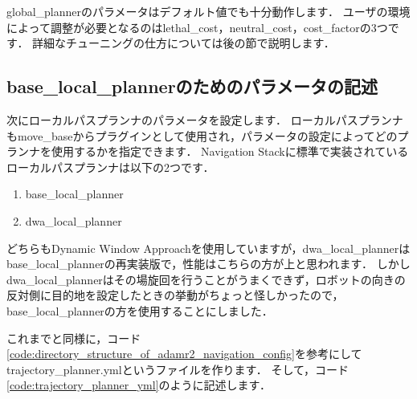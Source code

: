 \documentclass[{../../master}]{subfiles}
\begin{document}
\textsf{global\_planner}のパラメータはデフォルト値でも十分動作します．
ユーザの環境によって調整が必要となるのは\textsf{lethal\_cost}，\textsf{neutral\_cost}，\textsf{cost\_factor}の3つです．
詳細なチューニングの仕方については後の節で説明します．

\subsection{\textsf{base\_local\_planner}のためのパラメータの記述}

次にローカルパスプランナのパラメータを設定します．
ローカルパスプランナも\textsf{move\_base}からプラグインとして使用され，パラメータの設定によってどのプランナを使用するかを指定できます．
Navigation Stackに標準で実装されているローカルパスプランナは以下の2つです．

\begin{enumerate}
  \item \textsf{base\_local\_planner}
  \item \textsf{dwa\_local\_planner}
\end{enumerate}

どちらもDynamic Window Approach\cite{dwa}を使用していますが，\textsf{dwa\_local\_planner}は\textsf{base\_local\_planner}の再実装版で，性能はこちらの方が上と思われます．
しかし\textsf{dwa\_local\_planner}はその場旋回を行うことがうまくできず，ロボットの向きの反対側に目的地を設定したときの挙動がちょっと怪しかったので，\textsf{base\_local\_planner}の方を使用することにしました．

これまでと同様に，コード\ref{code:directory_structure_of_adamr2_navigation_config}を参考にして\textsf{trajectory\_planner.yml}というファイルを作ります．
そして，コード\ref{code:trajectory_planner_yml}のように記述します．
\end{document}
